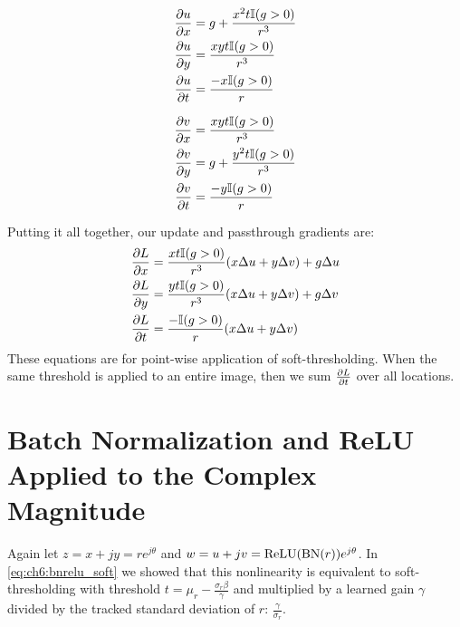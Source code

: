 \begin{minipage}{.48\linewidth}
\begin{align}
  \frac{\partial u}{\partial x} &= g + \frac{x^2t\mathbb{I}(g > 0)}{r^3} \\
  \frac{\partial u}{\partial y} &= \frac{xyt\mathbb{I}(g > 0)}{r^3} \\
  \frac{\partial u}{\partial t} &= \frac{-x\mathbb{I}(g > 0)}{r}
\end{align}
\vspace{5pt}
\end{minipage}
\begin{minipage}{.48\linewidth}
\begin{align}
  \frac{\partial v}{\partial x} &= \frac{xyt\mathbb{I}(g > 0)}{r^3} \\
  \frac{\partial v}{\partial y} &=g + \frac{y^2t\mathbb{I}(g > 0)}{r^3} \\
  \frac{\partial v}{\partial t} &= \frac{-y\mathbb{I}(g > 0)}{r}
\end{align}
\vspace{5pt}
\end{minipage}
Putting it all together, our update and passthrough gradients are:
\begin{align}
  \frac{\partial L}{\partial x} &= \frac{xt\mathbb{I}(g>0)}{r^3}(x\Delta u + y\Delta v) + g\Delta u \label{eq:appE:softx}\\
  \frac{\partial L}{\partial y} &= \frac{yt\mathbb{I}(g>0)}{r^3}(x\Delta u + y\Delta v) + g\Delta v \label{eq:appE:softy}\\
  \frac{\partial L}{\partial t} &= \frac{-\mathbb{I}(g > 0)}{r} (x\Delta u + y\Delta v) \label{eq:appE:softt}
\end{align}
These equations are for point-wise application of soft-thresholding. When
the same threshold is applied to an entire image, then we sum $\frac{\partial L}{\partial t}$ over all locations.

\section{Batch Normalization and ReLU Applied to the Complex Magnitude}\label{sec:appE:bnrelu}
Again let $z= x+jy = re^{j\theta}$ and $w=u + jv = \mathrm{ReLU}(\mathrm{BN}(r))e^{j\theta}$. 
In \eqref{eq:ch6:bnrelu_soft} we showed that this nonlinearity is equivalent to
soft-thresholding with threshold $t= \mu_r - \frac{\sigma_r\beta}{\gamma}$ and
multiplied by a learned gain $\gamma$ divided by the tracked standard deviation of 
$r$: $\frac{\gamma}{\sigma_r}$. 

